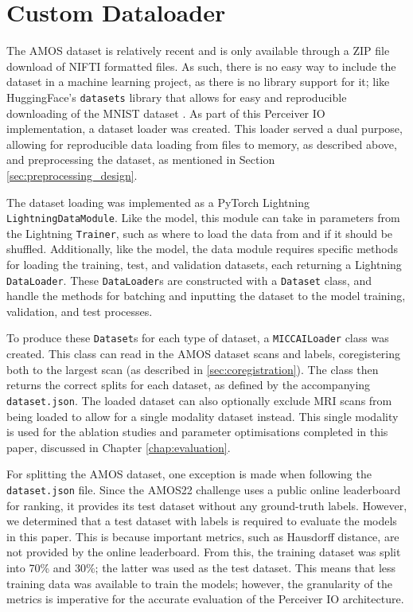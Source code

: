 \documentclass{l4proj}
\begin{document}
\section{Custom Dataloader} \label{sec:custom_dataloader}

The AMOS dataset is relatively recent and is only available through a ZIP file download of NIFTI formatted files. As such, there is no easy way to include the dataset in a machine learning project, as there is no library support for it; like HuggingFace’s \lstinline{datasets} library that allows for easy and reproducible downloading of the MNIST dataset \citep{deng2012mnist}. As part of this Perceiver IO implementation, a dataset loader was created. This loader served a dual purpose, allowing for reproducible data loading from files to memory, as described above, and preprocessing the dataset, as mentioned in Section \ref{sec:preprocessing_design}.

The dataset loading was implemented as a PyTorch Lightning \lstinline{LightningDataModule}. Like the model, this module can take in parameters from the Lightning \lstinline{Trainer}, such as where to load the data from and if it should be shuffled. Additionally, like the model, the data module requires specific methods for loading the training, test, and validation datasets, each returning a Lightning \lstinline{DataLoader}. These \lstinline{DataLoader}s are constructed with a \lstinline{Dataset} class, and handle the methods for batching and inputting the dataset to the model training, validation, and test processes.

To produce these \lstinline{Dataset}s for each type of dataset, a \lstinline{MICCAILoader} class was created. This class can read in the AMOS dataset scans and labels, coregistering both to the largest scan (as described in \ref{sec:coregistration}). The class then returns the correct splits for each dataset, as defined by the accompanying \lstinline{dataset.json}. The loaded dataset can also optionally exclude MRI scans from being loaded to allow for a single modality dataset instead. This single modality is used for the ablation studies and parameter optimisations completed in this paper, discussed in Chapter \ref{chap:evaluation}.

For splitting the AMOS dataset, one exception is made when following the \lstinline{dataset.json} file. Since the AMOS22 challenge uses a public online leaderboard for ranking, it provides its test dataset without any ground-truth labels. However, we determined that a test dataset with labels is required to evaluate the models in this paper. This is because important metrics, such as Hausdorff distance, are not provided by the online leaderboard. From this, the training dataset was split into 70\% and 30\%; the latter was used as the test dataset. This means that less training data was available to train the models; however, the granularity of the metrics is imperative for the accurate evaluation of the Perceiver IO architecture.
\end{document}
